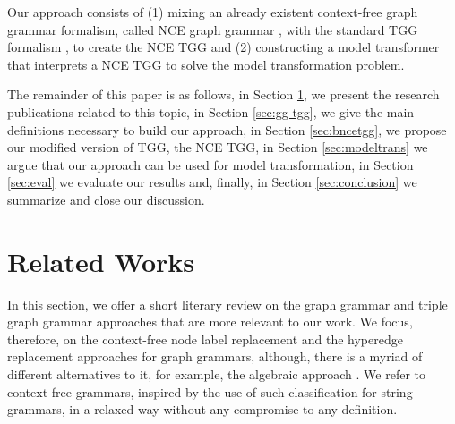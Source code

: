 \documentclass[runningheads]{llncs}
\begin{document}
Our approach consists of (1) mixing an already existent context-free graph grammar formalism, called NCE graph grammar \cite{janssens1982graph}, with the standard TGG formalism \cite{schurr1994specification}, to create the NCE TGG and (2) constructing a model transformer that interprets a NCE TGG to solve the model transformation problem.

The remainder of this paper is as follows, in Section \ref{sec:rw}, we present the research publications related to this topic, in Section \ref{sec:gg-tgg}, we give the main definitions necessary to build our approach, in Section \ref{sec:bncetgg}, we propose our modified version of TGG, the NCE TGG, in Section \ref{sec:modeltrans} we argue that our approach can be used for model transformation, in Section \ref{sec:eval} we evaluate our results and, finally, in Section \ref{sec:conclusion} we summarize and close our discussion.

\section{Related Works}
\label{sec:rw}
In this section, we offer a short literary review on the graph grammar and triple graph grammar approaches that are more relevant to our work. We focus, therefore, on the context-free node label replacement and the hyperedge replacement approaches for graph grammars, although, there is a myriad of different alternatives to it, for example, the algebraic approach \cite{ehrig1999handbook}. We refer to context-free grammars, inspired by the use of such classification for string grammars, in a relaxed way without any compromise to any definition.

\end{document}
